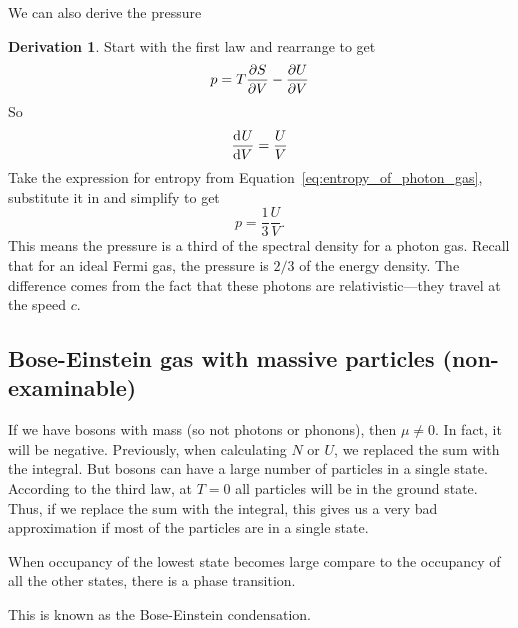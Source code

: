 \documentclass[12pt,chapterprefix=false,dvipsnames]{scrbook}
\theoremstyle{dotless}
\theoremstyle{definition}
\newtheorem{protoderivation}{Derivation}[section]
\newenvironment{derivation}
{\colorlet{shadecolor}{purple!15}\begin{shaded}\begin{protoderivation}}
			{\end{protoderivation}\end{shaded}}
\begin{document}
We can also derive the pressure
\begin{derivation}
	Start with the first law and rearrange to get
	\begin{equation}
		p = T\pdv{S}{V} - \pdv{U}{V}
	\end{equation}
	So
	\begin{equation}
		\dv[]{U}{V} = \frac{U}{V}
	\end{equation}
	Take the expression for entropy from
	Equation~\ref{eq:entropy_of_photon_gas}, substitute it in and simplify
	to get
	\begin{equation}
		\label{eq:pressure_of_photon_gas}
		p =\frac{1}{3}\frac{U}{V}.
	\end{equation}
	This means the pressure is a third of the spectral density for a
	photon gas. Recall that for an ideal Fermi gas, the pressure is
	$2/3$ of the energy density. The difference
	comes from the fact that these photons are relativistic---they
	travel at the speed $c$.
\end{derivation}

\subsection{Bose-Einstein gas with massive particles (non-examinable)}%
\label{sub:bose_einstein_gas_with_massive_particles}

If we have bosons with mass (so not photons or phonons), then
$\mu\neq 0$. In fact, it will be negative.
Previously, when calculating $N$ or
$U$, we replaced the sum with the integral.
But bosons can have a large number of particles in a single
state. According to the third law, at $T = 0$
all particles will be in the ground state. Thus, if we replace
the sum with the integral, this gives us a very bad
approximation if most of the particles are in a single state.

When occupancy of the lowest state becomes large compare to the
occupancy of all the other states, there is a phase transition.

This is known as the Bose-Einstein condensation.
\end{document}
